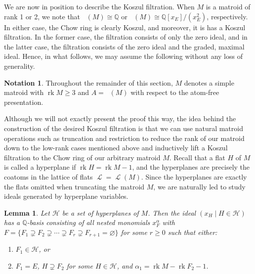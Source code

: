 \documentclass[11pt, reqno]{amsart}
\DeclareMathOperator{\Chow}{\underline{CH}}		%
\renewcommand{\emptyset}{\varnothing}
\newcommand{\iso}{\cong}
\DeclareMathOperator{\LL}{\mathcal{L}}
\newcommand{\QQ}{\mathbb{Q}}
\DeclareMathOperator{\rk}{rk}
\newtheorem{lemma}[thm]{Lemma}
\theoremstyle{definition}
\newtheorem*{notation}{Notation}
\numberwithin{equation}{section}
\numberwithin{table}{section}
\begin{document}
\begin{spacing}{1.1}
 We are now in position to describe the Koszul filtration.
 When $M$ is a matroid of rank 1 or 2, we note that $\Chow(M) \iso \QQ$ or $\Chow(M) \iso \QQ[x_E]/(x_E^2)$, respectively.  In either case, the Chow ring is clearly Koszul, and moreover, it is has a Koszul filtration.  In the former case, the filtration consists of only the zero ideal, and in the latter case, the filtration consists of the zero ideal and the graded, maximal ideal.   Hence, in what follows, we may assume the following without any loss of generality.



\begin{notation}
Throughout the remainder of this section, $M$ denotes a simple matroid with $\rk M \geq 3$ and $A = \Chow(M)$ with respect to the atom-free presentation.
\end{notation}

Although we will not exactly present the proof this way, the idea behind the construction of the desired Koszul filtration is that we can use natural matroid operations such as truncation and restriction to reduce the rank of our matroid down to the low-rank cases mentioned above and inductively lift a Koszul filtration to the Chow ring of our arbitrary matroid $M$. Recall that a flat $H$ of $M$ is called a hyperplane if $\rk H = \rk M - 1$, and the hyperplanes are precisely the coatoms in the lattice of flats $\LL = \LL(M)$.  Since the hyperplanes are exactly the flats omitted when truncating the matroid $M$, we are naturally led to study ideals generated by hyperplane variables.

\begin{lemma} \label{hyperplane:ideal:basis}
Let $\mathcal{H}$ be a set of hyperplanes of $M$.  Then the ideal $(x_H \mid H \in \mathcal{H})$ has a $\QQ$-basis consisting of all nested monomials $x_F^\alpha$ with $F = \{F_1 \supsetneq F_2 \supsetneq \cdots \supsetneq F_r \supsetneq F_{r+1} = \emptyset \}$ for some $r \geq 0$ such that either: 
\begin{enumerate}[label = \textnormal{(\roman*)}]
\item $F_1 \in \mathcal{H}$, or 
\item $F_1 = E$, $H \supsetneq F_2$ for some $H \in \mathcal{H}$, and $\alpha_1 = \rk M - \rk F_2 - 1$. 
\end{enumerate}
\end{lemma}


\end{spacing}
\end{document}

